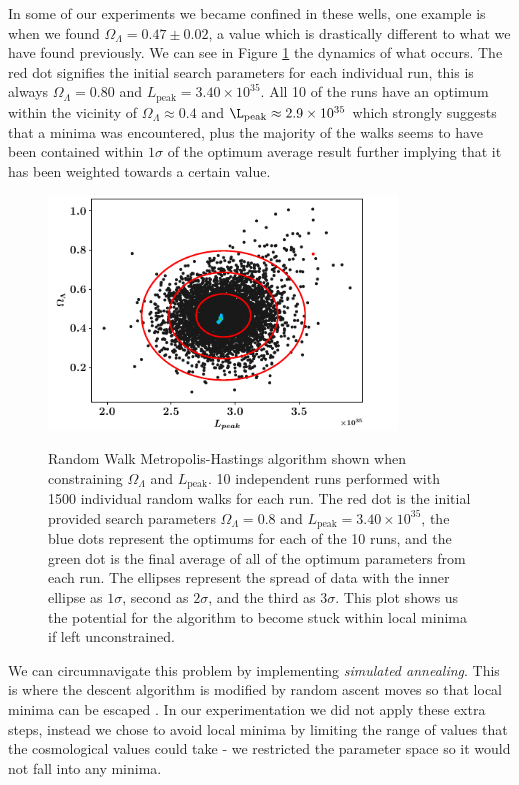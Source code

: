 \documentclass[twocolumn]{revtex4}
\begin{document}
{In some of our experiments we became confined in these wells, one example is when we found $\Omega_\Lambda=0.47\pm0.02$, a value which is drastically different to what we have found previously. We can see in Figure \ref{fig:mcmc_search} the dynamics of what occurs. The red dot signifies the initial search parameters for each individual run, this is always $\Omega_\Lambda=0.80$ and $L_\text{peak}=3.40\times10^{35}$. All 10 of the runs have an optimum within the vicinity of $\Omega_\Lambda \approx 0.4$ and $\L_\text{peak}\approx2.9\times10^{35}$ which strongly suggests that a minima was encountered, plus the majority of the walks seems to have been contained within $1\sigma$ of the optimum average result further implying that it has been weighted towards a certain value.

\begin{figure}[!h]
\begin{center}
\includegraphics[width=9.25cm]{results/ol_lp_complete}
\caption[]{Random Walk Metropolis-Hastings algorithm shown when constraining $\Omega_\Lambda$ and $L_\text{peak}$. 10 independent runs performed with 1500 individual random walks for each run. The red dot is the initial provided search parameters $\Omega_\Lambda=0.8$ and $L_\text{peak}=3.40\times10^{35}$, the blue dots represent the optimums for each of the 10 runs, and the green dot is the final average of all of the optimum parameters from each run. The ellipses represent the spread of data with the inner ellipse as $1\sigma$, second as $2\sigma$, and the third as $3\sigma$. This plot shows us the potential for the algorithm to become stuck within local minima if left unconstrained. }
\vspace{-5ex}
\label{fig:mcmc_search}
\end{center}
\end{figure}

We can circumnavigate this problem by implementing \textit{simulated annealing}. This is where the descent algorithm is modified by random ascent moves so that local minima can be escaped \cite{simulated_annealing}. In our experimentation we did not apply these extra steps, instead we chose to avoid local minima by limiting the range of values that the cosmological values could take - we restricted the parameter space so it would not fall into any minima. 

}
\end{document}
